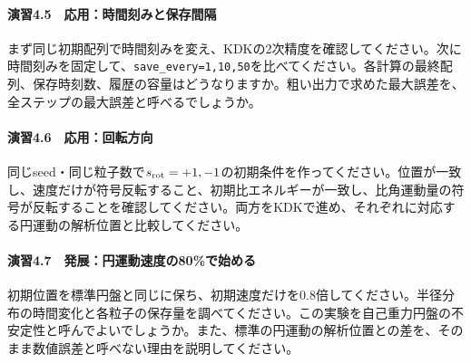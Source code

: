 \paragraph{演習4.5　応用：時間刻みと保存間隔}
まず同じ初期配列で時間刻みを変え、KDKの2次精度を確認してください。次に時間刻みを固定して、\texttt{save\_every=1,10,50}を比べてください。各計算の最終配列、保存時刻数、履歴の容量はどうなりますか。粗い出力で求めた最大誤差を、全ステップの最大誤差と呼べるでしょうか。

\paragraph{演習4.6　応用：回転方向}
同じseed・同じ粒子数で$s_{\rm rot}=+1,-1$の初期条件を作ってください。位置が一致し、速度だけが符号反転すること、初期比エネルギーが一致し、比角運動量の符号が反転することを確認してください。両方をKDKで進め、それぞれに対応する円運動の解析位置と比較してください。

\paragraph{演習4.7　発展：円運動速度の80\%で始める}
初期位置を標準円盤と同じに保ち、初期速度だけを0.8倍してください。半径分布の時間変化と各粒子の保存量を調べてください。この実験を自己重力円盤の不安定性と呼んでよいでしょうか。また、標準の円運動の解析位置との差を、そのまま数値誤差と呼べない理由を説明してください。
